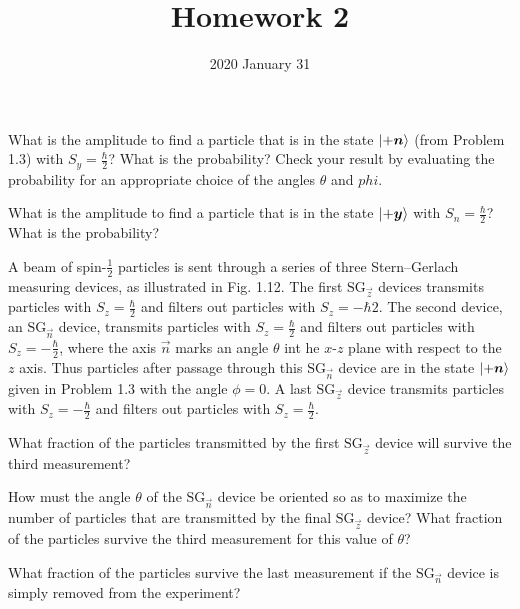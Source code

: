 \documentclass{../phys116}
\title{Homework 2}
\author{}
\date{2020 January 31}
\begin{document}
\begin{exercise}
  \begin{problems}
  \item What is the amplitude to find a particle that is in the state
    \(\ket{+\vec n}\) (from Problem 1.3) with \(S_y = \frac \hbar 2\)?
    What is the probability?  Check your result by evaluating the
    probability for an appropriate choice of the angles \(\theta\) and
    \(phi\).
  \item What is the amplitude to find a particle that is in the state
    \(\ket{+\vec y}\) with \(S_n = \frac \hbar 2\)?  What is the
    probability?
  \end{problems}
\end{exercise}

\begin{solution}
\end{solution}

\begin{exercise}
  \newcommand{\SG}{\mathrm{SG}}

  A beam of spin-\(\frac 1 2\) particles is sent through a series of
  three Stern--Gerlach measuring devices, as illustrated in Fig. 1.12.
  The first \(\SG_{\vec z}\) devices transmits particles with
  \(S_z = \frac \hbar 2\) and filters out particles with
  \(S_z = -\hbar 2\).  The second device, an \(\SG_{\vec n}\) device,
  transmits particles with \(S_z = \frac \hbar 2\) and filters out
  particles with \(S_z = -\frac \hbar 2\), where the axis \(\vec n\)
  marks an angle \(\theta\) int he \(x\)-\(z\) plane with respect to
  the \(z\) axis.  Thus particles after passage through this
  \(\SG_{\vec n}\) device are in the state \(\ket{+\vec n}\) given in
  Problem 1.3 with the angle \(\phi = 0\).  A last \(\SG_{\vec z}\)
  device transmits particles with \(S_z = -\frac \hbar 2\) and filters
  out particles with \(S_z = \frac \hbar 2\).
  \begin{problems}
  \item What fraction of the particles transmitted by the first
    \(\SG_{\vec z}\) device will survive the third measurement?
  \item How must the angle \(\theta\) of the \(\SG_{\vec n}\) device
    be oriented so as to maximize the number of particles that are
    transmitted by the final \(\SG_{\vec z}\) device?  What fraction
    of the particles survive the third measurement for this value of
    \(\theta\)?
  \item What fraction of the particles survive the last measurement if
    the \(\SG_{\vec n}\) device is simply removed from the experiment?
  \end{problems}
\end{exercise}
\end{document}
